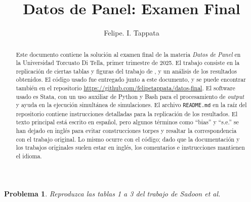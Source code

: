 \documentclass[12pt,letterpaper,reqno,oneside]{amsart}
\theoremstyle{problemstyle} %
\newtheorem{problem}{Problema}
\theoremstyle{definition} %
\renewcommand{\thesolution}{\theproblem~(\alph{solution})}
\begin{document}
\author[F. I. Tappata]{Felipe. I. Tappata}
\date{}

\title[Examen Final]{Datos de Panel: Examen Final}
\begin{abstract}
  Este documento contiene la solución al examen final de la materia \emph{Datos de Panel} en la Universidad Torcuato Di Tella, primer trimestre de 2025.
  El trabajo consiste en la replicación de ciertas tablas y figuras del trabajo de \textcite{al-sadoonSimpleMethodsConsistent2019}, y un análisis de los resultados obtenidos.
  El código usado fue entregado junto a este documento, y se puede encontrar también en el repositorio \url{https://github.com/felipetappata/datos-final}.
  El software usado es Stata, con un uso auxiliar de Python y Bash para el procesamiento de \emph{output} y ayuda en la ejecución simultánea de simulaciones.
  El archivo \texttt{README.md} en la raíz del repositorio contiene instrucciones detalladas para la replicación de los resultados.
  El texto principal está escrito en español, pero algunos términos como \enquote{bias} y \enquote{s.e.} se han dejado en inglés para evitar construcciones torpes y resaltar la correspondencia con el trabajo original.
  Lo mismo ocurre con el código; dado que la documentación y los trabajos originales suelen estar en inglés, los comentarios e instrucciones mantienen el idioma.
\end{abstract}
\maketitle
\begin{mdframed}
  \begin{problem}
  \label{prob:1}
  Reproduzca las tablas 1 a 3 del trabajo de Sadoon et al.
  \end{problem}
\end{mdframed}
\begingroup
\renewcommand{\thesolution}{\theproblem}
\end{document}
